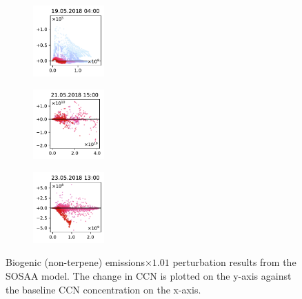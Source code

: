 \begin{figure}[H]
    \begin{subfigure}
        \centering
        \includegraphics[width=0.30\textwidth,valign=t]{evaluation/figures/perturbations/perturbation-19.05.2018:04.00-biogenic-mul-1.01.pdf}
    \end{subfigure}
    \begin{subfigure}
        \centering
        \includegraphics[width=0.30\textwidth,valign=t]{evaluation/figures/perturbations/perturbation-21.05.2018:15.00-biogenic-mul-1.01.pdf}
    \end{subfigure}
    \begin{subfigure}
        \centering
        \includegraphics[width=0.30\textwidth,valign=t]{evaluation/figures/perturbations/perturbation-23.05.2018:13.00-biogenic-mul-1.01.pdf}
    \end{subfigure}

    \caption[Biogenic emissions$\times 1.01$ perturbation SOSAA results]{Biogenic (non-terpene) emissions$\times 1.01$ perturbation results from the SOSAA model. The change in CCN is plotted on the y-axis against the baseline CCN concentration on the x-axis.}
    \label{fig:sosaa-perturbation-biogenic-mul-1.01}
\end{figure}

